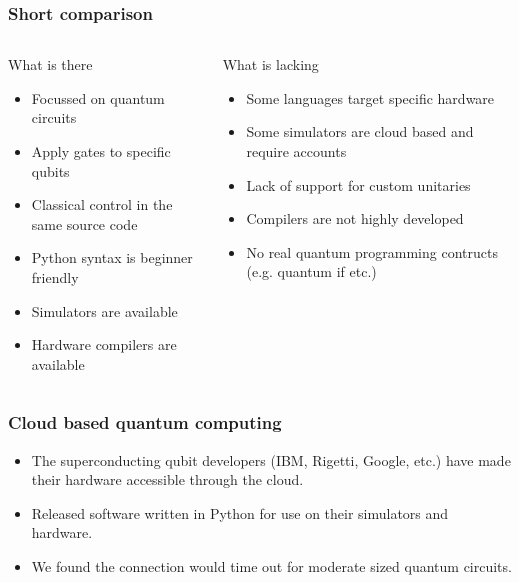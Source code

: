 \documentclass{beamer}
\begin{document}
\begin{frame}
\frametitle{Short comparison}
\begin{columns}
    \begin{block}{What is there}
    \begin{itemize}
        \item Focussed on quantum circuits
        \item Apply gates to specific qubits
        \item Classical control in the same source code
        \item Python syntax is beginner friendly
        \item Simulators are available
        \item Hardware compilers are available
    \end{itemize}
    \end{block}
    \begin{block}{What is lacking}
        \begin{itemize}
            \item Some languages target specific hardware
            \item Some simulators are cloud based and require accounts
            \item Lack of support for custom unitaries
            \item Compilers are not highly developed
            \item No real quantum programming contructs (e.g. quantum if etc.)
        \end{itemize}
        \end{block}
\end{columns}
\end{frame}

\begin{frame}
  \frametitle{Cloud based quantum computing}
  \begin{itemize}
  \item The superconducting qubit developers (IBM, Rigetti, Google, etc.) have made their
      hardware accessible through the cloud. 
  \item Released software written in Python for use on their simulators and hardware.
    \item We found the connection would time out for
        moderate sized quantum circuits.
  \end{itemize}
\end{frame}
\end{document}
